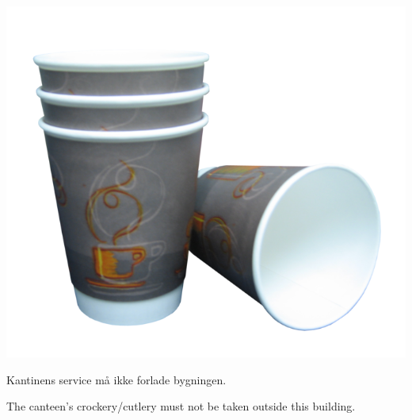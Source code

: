 \documentclass{article}
\begin{document}
\maketitle

\null
\vspace{-1.5cm}


\begin{center}

\vspace{-1cm}

\includegraphics[scale=1.1]{billeder/papercupsWikiCommons.png}

\end{center}

\vspace{0.8cm}

\begin{center}

\huge Kantinens service må ikke forlade bygningen.

\english

\huge The canteen's crockery/cutlery must not be taken outside this building.

\end{center}

\dansk

\underskriv
\end{document}
